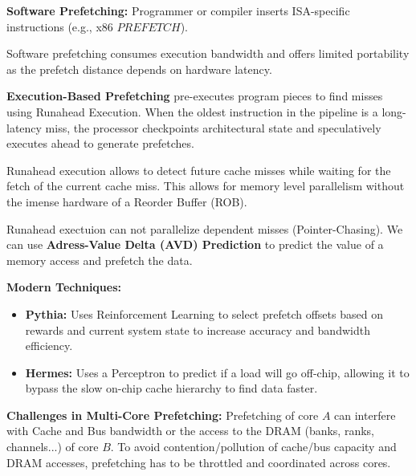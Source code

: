 \begin{definition}
	\textbf{Software Prefetching:} Programmer or compiler inserts ISA-specific instructions (e.g., x86 $PREFETCH$).
\end{definition}

\begin{remark}
	Software prefetching consumes execution bandwidth and offers limited portability as the prefetch distance depends on hardware latency.
\end{remark}

\begin{definition}
	\textbf{Execution-Based Prefetching} pre-executes program pieces to find misses using Runahead Execution.
	When the oldest instruction in the pipeline is a long-latency miss, the processor checkpoints architectural state and speculatively executes ahead to generate prefetches.
\end{definition}

\begin{remark}
	Runahead execution allows to detect future cache misses while waiting for the fetch of the current cache miss. This allows for memory level parallelism without the imense hardware of a Reorder Buffer (ROB).
\end{remark}

\begin{remark}
	Runahead exectuion can not parallelize dependent misses (Pointer-Chasing). We can use \textbf{Adress-Value Delta (AVD) Prediction} to predict the value of a memory access and prefetch the data.
\end{remark}

\begin{remark}
	\textbf{Modern Techniques:}
	\begin{itemize}
		\item \textbf{Pythia:} Uses Reinforcement Learning to select prefetch offsets based on rewards and current system state to increase accuracy and bandwidth efficiency.
		\item \textbf{Hermes:} Uses a Perceptron to predict if a load will go off-chip, allowing it to bypass the slow on-chip cache hierarchy to find data faster.
	\end{itemize}
\end{remark}

\begin{remark}
	\textbf{Challenges in Multi-Core Prefetching:} Prefetching of core $A$ can interfere with Cache and Bus bandwidth or the access to the DRAM (banks, ranks, channels...) of core $B$. To avoid contention/pollution of cache/bus capacity and DRAM accesses, prefetching has to be throttled and coordinated across cores.
\end{remark}

